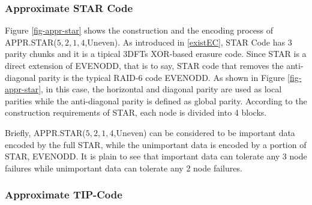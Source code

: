 \documentclass[sigconf]{acmart}
\begin{document}
\subsubsection{Approximate STAR Code}
Figure \ref{fig-appr-star} shows the construction and the encoding process of APPR.STAR($5,2,1,4$,Uneven).
As introduced in \ref{existEC}, STAR Code \cite{STAR} has 3 parity chunks and it is a tipical 3DFTs XOR-based erasure code.
Since STAR is a direct extension of EVENODD\cite{EVENODD}, that is to say, STAR code that removes the anti-diagonal parity is the typical RAID-6 code EVENODD. As shown in Figure \ref{fig-appr-star}, in this case, the horizontal and diagonal parity are used as local parities while the anti-diagonal parity is defined as global parity.
According to the construction requirements of STAR, each node is divided into 4 blocks.

Briefly, APPR.STAR($5,2,1,4$,Uneven) can be considered to be important data encoded by the full STAR, while the unimportant data is encoded by a portion of STAR, EVENODD. It is plain to see that important data can tolerate any 3 node failures while unimportant data can tolerate any 2 node failures.

\subsubsection{Approximate TIP-Code}
\end{document}

